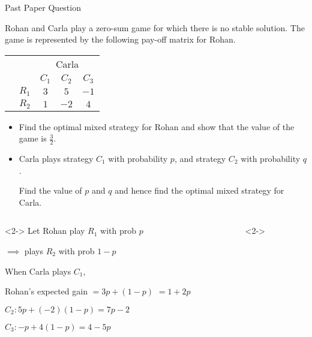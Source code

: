 \documentclass[8pt]{beamer}
\begin{document}
\begin{frame}[shrink=15]{Past Paper Question}
	\begin{problem}
		Rohan and Carla play a zero-sum game for which there is no stable solution. The game is represented by the following pay-off matrix for Rohan.

			\begin{center}	
			\colorbox{cc}{
  \setlength\arrayrulewidth{0.5mm}
	\begin{tabular}{cc|ccc}
\multicolumn{2}{c}{} & \multicolumn{3}{c}{Carla}\\
\multicolumn{1}{c}{} &  & $C_1$  & $C_2$ & $ C_3$ \\ \hline 
\raisebox{0cm}{\multirow{2}*{\rotatebox{90}{Rohan}}}  & $R_1$ & $3$ & $5$ & $-1$ \\
						     & $R_2$ & $1$ & $-2$ & $4$ \\
\end{tabular}}
\end{center}

\begin{itemize}
	\item Find the optimal mixed strategy for Rohan and show that the value of the game is $\frac{3}{2}$.
	\item Carla plays strategy $C_1$ with probability $p$, and strategy $ C_2$ with probability $q$.

		Find the value of  $p$ and  $q$ and hence find the optimal mixed strategy for Carla.
\end{itemize}
	\end{problem}
	\begin{columns}[T]
	\begin{column}{.3\linewidth}
	\begin{solution}<2->
		Let Rohan play $ R_1$ with prob $p$

		 $\implies$ plays $ R_2$ with prob $1-p$

		 When Carla plays  $ C_1$,

		 Rohan's expected gain $=3p+(1-p)$
		  $=1+2p$

		  $ C_2:5p+(-2)(1-p)=7p-2$

		  $ C_3:-p+4(1-p)=4-5p$
	\end{solution}
	\end{column}
	\begin{column}{.4\linewidth}
	\begin{solution}<2->
\end{solution}
\end{column}
\end{columns}
\end{frame}
\end{document}
